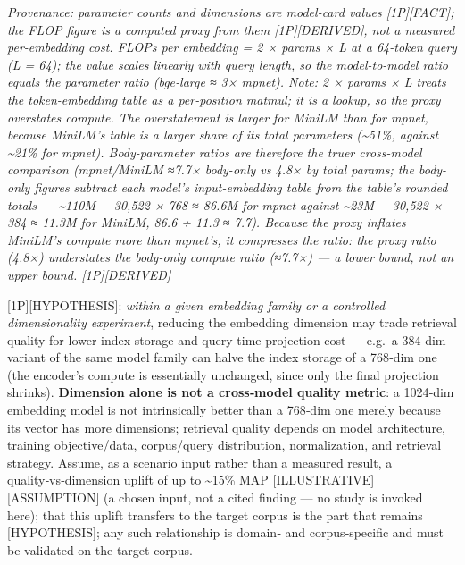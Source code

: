 \emph{Provenance: parameter counts and dimensions are model-card values
\mbox{{[}1P{]}}\hspace{0pt}\mbox{{[}FACT{]}}; the FLOP figure is a computed proxy from them
\mbox{{[}1P{]}}\hspace{0pt}\mbox{{[}DERIVED{]}}, not a measured per-embedding cost. FLOPs per
embedding = 2 × params × L at a 64-token query (L = 64); the value
scales linearly with query length, so the model-to-model ratio equals
the parameter ratio (bge‑large ≈ 3× mpnet). Note: 2 × params × L treats
the token-embedding table as a per-position matmul; it is a lookup, so
the proxy overstates compute. The overstatement is larger for MiniLM
than for mpnet, because MiniLM's table is a larger share of its total
parameters (\textasciitilde51\%, against \textasciitilde21\% for mpnet).
Body-parameter ratios are therefore the truer cross-model comparison
(mpnet/MiniLM ≈7.7× body-only vs 4.8× by total params; the body-only
figures subtract each model's input-embedding table from the table's
rounded totals --- \textasciitilde110M − 30,522 × 768 ≈ 86.6M for mpnet
against \textasciitilde23M − 30,522 × 384 ≈ 11.3M for MiniLM, 86.6 ÷
11.3 ≈ 7.7). Because the proxy inflates MiniLM's compute more than
mpnet's, it compresses the ratio: the proxy ratio (4.8×) understates the
body-only compute ratio (≈7.7×) --- a lower bound, not an upper bound.
\mbox{{[}1P{]}}\hspace{0pt}\mbox{{[}DERIVED{]}}}

\mbox{{[}1P{]}}\hspace{0pt}\mbox{{[}HYPOTHESIS{]}}: \emph{within a given embedding family or a
controlled dimensionality experiment}, reducing the embedding dimension
may trade retrieval quality for lower index storage and query‑time
projection cost --- e.g.~a 384‑dim variant of the same model family can
halve the index storage of a 768‑dim one (the encoder's compute is
essentially unchanged, since only the final projection shrinks).
\textbf{Dimension alone is not a cross‑model quality metric}: a 1024‑dim
embedding model is not intrinsically better than a 768‑dim one merely
because its vector has more dimensions; retrieval quality depends on
model architecture, training objective/data, corpus/query distribution,
normalization, and retrieval strategy. Assume, as a scenario input
rather than a measured result, a quality‑vs‑dimension uplift of up to
\textasciitilde15\% MAP \mbox{{[}ILLUSTRATIVE{]}}\hspace{0pt}\mbox{{[}ASSUMPTION{]}} (a chosen
input, not a cited finding --- no study is invoked here); that this
uplift transfers to the target corpus is the part that remains
\mbox{{[}HYPOTHESIS{]}}; any such relationship is domain‑ and corpus‑specific
and must be validated on the target corpus.

